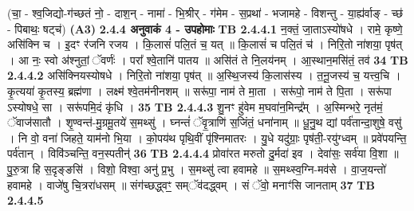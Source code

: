 \documentclass[17pt]{extarticle}
\begin{document}
                  \newline
                                    (चा॒ - श्व॒जिद्यो-ग॑च्छतं नो॒ - दाश॒न् - नामा॑ - भि॒श्रीर् - ग॑मेम - स॒प्रथा॑ - भजामहे - विशन्तु - या॒ह्य॑र्वाङ् - च्छ॑ - पिबाथः॒ षट्च॑) \textbf{(A3)} \newline \newline
                \textbf{ 2.4.4      अनुवाकं   4 - उपहोमाः} \newline
                                \textbf{ TB 2.4.4.1} \newline
                  न॒क्तं॒ जा॒ताऽस्यो॑षधे । रामे॒ कृष्णे॒ असि॑क्नि च । इ॒दꣳ र॑जनि रजय । कि॒लासं॑ पलि॒तं च॒ यत् ॥ कि॒लासं॑ च पलि॒तं च॑ । निरि॒तो ना॑शया॒ पृष॑त् । आ नः॒ स्वो अ॑श्नुतां॒ ॅवर्णः॑ । परा᳚ श्वे॒तानि॑ पातय ॥ असि॑तं ते नि॒लय॑नम् । आ॒स्थान॒मसि॑तं॒ तव॑ \textbf{ 34} \newline
                  \newline
                                \textbf{ TB 2.4.4.2} \newline
                  असि॑क्नियस्योषधे । निरि॒तो ना॑शया॒ पृष॑त् ॥ अ॒स्थि॒जस्य॑ कि॒लास॑स्य । त॒नू॒जस्य॑ च॒ यत्त्व॒चि । कृ॒त्यया॑ कृ॒तस्य॒ ब्रह्म॑णा । लक्ष्म॑ श्वे॒तम॑नीनशम् ॥ सरू॑पा॒ नाम॑ ते मा॒ता । सरू॑पो॒ नाम॑ ते पि॒ता । सरू॑पा ऽस्योषधे॒ सा । सरू॑पमि॒दं कृ॑धि । \textbf{ 35} \newline
                  \newline
                                \textbf{ TB 2.4.4.3} \newline
                  शु॒नꣳ हु॑वेम म॒घवा॑न॒मिन्द्र᳚म् । अ॒स्मिन्भरे॒ नृत॑मं॒ ॅवाज॑सातौ । शृ॒ण्वन्त॑-मु॒ग्रमू॒तये॑ स॒मथ्सु॑ । घ्नन्तं॑ ॅवृ॒त्राणि॑ स॒जिंतं॒ धना॑नाम् ॥ धू॒नु॒थ द्यां पर्व॑तान्दा॒शुषे॒ वसु॑ । नि वो॒ वना॑ जिहते॒ याम॑नो भि॒या । को॒पय॑थ पृथि॒वीं पृ॑श्निमातरः । यु॒धे यदु॑ग्राः॒ पृष॑ती॒-रयु॑ग्ध्वम् ॥ प्रवे॑पयन्ति॒ पर्व॑तान् । विवि॑ञ्चन्ति॒ वन॒स्पतीन्॑ \textbf{ 36} \newline
                  \newline
                                \textbf{ TB 2.4.4.4} \newline
                  प्रोवा॑रत मरुतो दु॒र्मदा॑ इव । देवा॑सः॒ सर्व॑या वि॒शा ॥ पु॒रु॒त्रा हि स॒दृङ्ङसि॑ । विशो॒ विश्वा॒ अनु॑ प्र॒भु । स॒मथ्सु॑ त्वा हवामहे ॥ स॒मथ्स्व॒ग्नि-मव॑से । वा॒ज॒यन्तो॑ हवामहे । वाजे॑षु चि॒त्ररा॑धसम् ॥ संग॑च्छद्ध्वꣳ॒॒ सम्ॅव॑दद्ध्वम् । सं ॅवो॒ मनाꣳ॑सि जानताम् \textbf{ 37} \newline
                  \newline
                                \textbf{ TB 2.4.4.5} \newline
\end{document}
